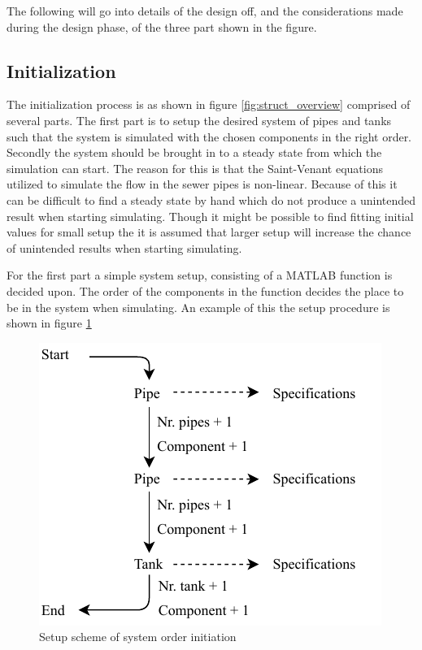 The following will go into details of the design off, and the considerations made during the design phase, of the three part shown in the figure.

\subsection*{Initialization} 
The initialization process is as shown in figure \ref{fig:struct_overview} comprised of several parts. The first part is to setup the desired system of pipes and tanks such that the system is simulated with the chosen components in the right order.
Secondly the system should be brought in to a steady state from which the simulation can start.
The reason for this is that the Saint-Venant equations utilized to simulate the flow in the sewer pipes is non-linear. Because of this it can be difficult to find a steady state by hand which do not produce a unintended result when starting simulating. Though it might be possible to find fitting initial values for small setup the it is assumed that larger setup will increase the chance of unintended results when starting simulating.

For the first part a simple system setup, consisting of a MATLAB function is decided upon. The order of the components in the function decides the place to be in the system when simulating. An example of this the setup procedure is shown in figure \ref{fig:sys_setup}  

\begin{figure}[H]
\centering
\includegraphics[width=0.5 \textwidth]{report/simulation/pictures/sys_setup.pdf}
\caption{Setup scheme of system order initiation}
\label{fig:sys_setup}
\end{figure}

